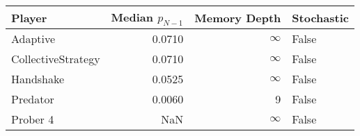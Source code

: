 \begin{tabular}{lrrl}
\toprule
             Player &  Median $p_{N-1}$ &  Memory Depth & Stochastic \\
\midrule
           Adaptive &            0.0710 &            \(\infty\) &      False \\
 CollectiveStrategy &            0.0710 &            \(\infty\) &      False \\
          Handshake &            0.0525 &            \(\infty\) &      False \\
           Predator &            0.0060 &             9 &      False \\
           Prober 4 &               NaN &            \(\infty\) &      False \\
\bottomrule
\end{tabular}
